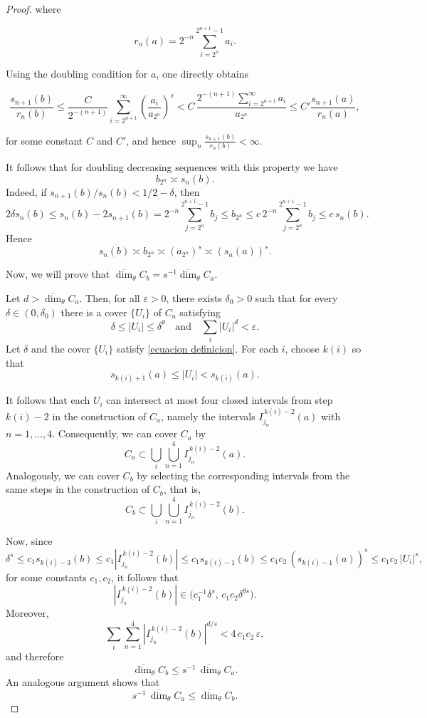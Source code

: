 \documentclass[11pt,reqno,bookmarksnumbered,raiselinks,breaklinks,colorlinks,plainpages]{amsart}
\renewcommand{\epsilon}{\varepsilon}
\begin{document}
\begin{proof}
where

$$
r_n(a) = 2^{-n}\sum_{i=2^n}^{2^{n+1}-1} a_i.
$$

Using the doubling condition for $a$, one directly obtains

$$
\frac{s_{n+1}(b)}{r_n(b)}\leq \frac{C}{2^{-(n+1)}} \sum_{i=2^{n+1}}^{\infty}\left(\frac{a_i}{a_{2^n}}\right)^s
< C\, \frac{2^{-(n+1)}\sum_{i=2^{n+1}}^{\infty}a_i}{a_{2^n}}
\leq C'\frac{s_{n+1}(a)}{r_n(a)},
$$

for some constant $C$ and $C'$, and hence $\sup_n \tfrac{s_{n+1}(b)}{r_n(b)} < \infty$.


It follows that for doubling decreasing sequences with this property we have\[b_{2^n}\asymp s_n(b).\]Indeed, if \(s_{n+1}(b)/s_n(b)<1/2-\delta\), then\[2\delta s_n(b) \leq s_n(b)-2s_{n+1}(b)=2^{-n}\sum_{j=2^n}^{2^{n+1}-1}b_j\leq b_{2^{n}}\leq c\, 2^{-n} \sum_{j=2^n}^{2^{n+1}-1}b_j \leq c\,s_n(b).\]Hence\[s_n(b)\asymp b_{2^n}\asymp (a_{2^n})^s\asymp (s_n(a))^s.\]


Now, we will prove that $\overline{\dim}_\theta C_b=s^{-1}\overline{\dim}_\theta C_a.$

Let $d > \overline{\dim}_\theta C_a$. Then, for all $\epsilon > 0$, there exists $\delta_0 > 0$ such that for every $\delta \in (0,\delta_0)$ there is a cover $\{U_i\}$ of $C_a$ satisfying
\begin{equation}\label{ecuacion definicion}
\delta \leq |U_i| \leq \delta^\theta
\quad \text{and} \quad
\sum_i |U_i|^d < \epsilon.
\end{equation}
Let $\delta$ and the cover $\{U_i\}$ satisfy \eqref{ecuacion definicion}. For each $i$, choose $k(i)$ so that
\[
s_{k(i)+1}(a) \leq |U_i| < s_{k(i)}(a).
\]

It follows that each $U_i$ can intersect at most four closed intervals from step $k(i)-2$ in the construction of $C_a$, namely the intervals $I_{j_n}^{\,k(i)-2}(a)$ with $n=1,\dots,4$. Consequently, we can cover $C_a$ by
\[
C_a \subset \bigcup_i \bigcup_{n=1}^4 I_{j_n}^{\,k(i)-2}(a).
\]
Analogously, we can cover $C_b$ by selecting the corresponding intervals from the same steps in the construction of $C_b$, that is,
\[
C_b \subset \bigcup_i \bigcup_{n=1}^4 I_{j_n}^{\,k(i)-2}(b).
\]



Now, since
\[
\delta^s \leq c_1 s_{k(i)-3}(b) \leq c_1 |I_{j_n}^{\,k(i)-2}(b)| \leq c_1 s_{k(i)-1}(b) 
\leq c_1 c_2 \,(s_{k(i)-1}(a))^s \leq c_1 c_2\, |U_i|^s,
\]
for some constants $c_1, c_2$, it follows that
\[
|I_{j_n}^{\,k(i)-2}(b)| \in \bigl(c_1^{-1}\delta^s,\, c_1 c_2 \delta^{\theta s}\bigr).
\]
Moreover,
\[
\sum_i \sum_{n=1}^4 |I_{j_n}^{\,k(i)-2}(b)|^{d/s} < 4\, c_1 c_2 \,\epsilon,
\]
and therefore
\[
\overline{\dim}_\theta C_b \leq s^{-1}\,\overline{\dim}_\theta C_a.
\]
An analogous argument shows that
\[
s^{-1}\,\overline{\dim}_\theta C_a \leq \overline{\dim}_\theta C_b.
\]








\end{proof}
\end{document}
